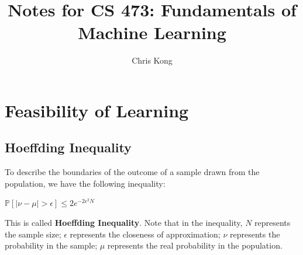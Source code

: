 \documentclass{article}
\title{Notes for CS 473: Fundamentals of Machine Learning}
\author{Chris Kong}
\begin{document}
\maketitle

\tableofcontents
\newpage


\section{Feasibility of Learning}
\subsection{Hoeffding Inequality}
To describe the boundaries of the outcome of a sample drawn from the population, we have the following inequality:
\begin{tcolorbox}[colback=yellow!20, colframe=yellow!90, title=Hoeffding Inequality, coltitle=black]
$\mathbb{P}[\mid \nu-\mu \mid > \epsilon] \leq 2e^{-2\epsilon^{2}N}$
\end{tcolorbox}
This is called \textbf{Hoeffding Inequality}. Note that in the inequality, $N$ represents the sample size; $\epsilon$ represents the closeness of approximation; $\nu$ represents the probability in the sample; $\mu$ represents the real probability in the population. 
\end{document}
